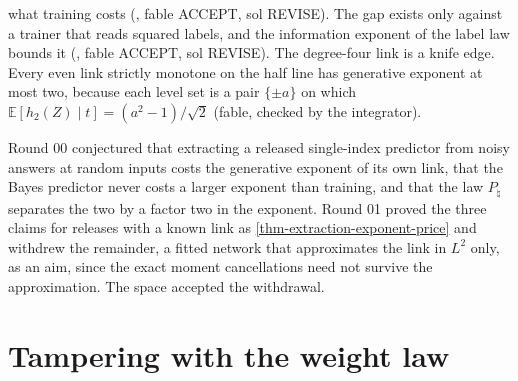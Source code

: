 \begin{theorem}
{what training costs (, fable ACCEPT, sol
REVISE). The gap exists only against a trainer that reads squared labels, and the
information exponent of the label law bounds it
(, fable ACCEPT, sol REVISE). The
degree-four link is a knife edge. Every even link strictly monotone on the half line
has generative exponent at most two, because each level set is a pair $\{\pm a\}$ on
which $\mathbb E[h_2(Z)\mid t]=(a^2-1)/\sqrt2$ (fable, checked by the integrator).}
\end{theorem}

\begin{conjecture}
Round 00 conjectured that extracting a released single-index predictor from noisy
answers at random inputs costs the generative exponent of its own link, that the Bayes
predictor never costs a larger exponent than training, and that the law $P_\natural$
separates the two by a factor two in the exponent. Round 01 proved the three claims for
releases with a known link as \cref{thm-extraction-exponent-price} and withdrew the
remainder, a fitted network that approximates the link in $L^2$ only, as an aim, since
the exact moment cancellations need not survive the approximation. The space accepted
the withdrawal.
\end{conjecture}

\section{Tampering with the weight law}

